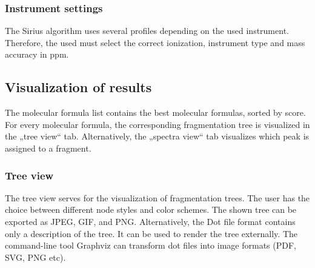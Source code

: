 \documentclass[a4paper,11pt]{article}
\begin{document}
 \subsubsection{Instrument settings}
 
 The Sirius algorithm uses several profiles depending on the used instrument. 
 Therefore, the used must select the correct ionization, instrument type  and mass accuracy in ppm.
 
 \subsection{Visualization of results}
 
 
 The molecular formula list contains the best molecular formulas, sorted by score. For every molecular formula, 
 the corresponding fragmentation tree is visualized in the „tree view“ tab. Alternatively, the „spectra view“ 
 tab visualizes which peak is assigned to a fragment.
 
 \subsubsection{Tree view}
 
 The tree view serves for the visualization of fragmentation trees. 
 The user has the choice between different node styles and  color schemes. 
 The shown tree can be exported as JPEG, GIF,  and PNG. 
 Alternatively, the Dot file format contains only a description of the tree. 
 It can be used to render the tree externally. The command-line tool Graphviz can 
 transform dot files into image formats (PDF, SVG, PNG etc).
 
 
\end{document}
